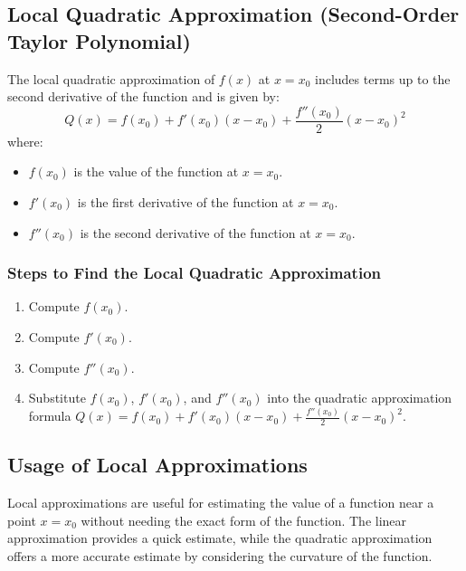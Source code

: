 \documentclass{article}
\begin{document}
\subsection*{Local Quadratic Approximation (Second-Order Taylor Polynomial)}
The local quadratic approximation of \( f(x) \) at \( x = x_0 \) includes terms up to the second derivative of the function and is given by:
\[ Q(x) = f(x_0) + f'(x_0)(x - x_0) + \frac{f''(x_0)}{2}(x - x_0)^2 \]
where:
\begin{itemize}
\item \( f(x_0) \) is the value of the function at \( x = x_0 \).
\item \( f'(x_0) \) is the first derivative of the function at \( x = x_0 \).
\item \( f''(x_0) \) is the second derivative of the function at \( x = x_0 \).
\end{itemize}

\begin{center}
\end{center}

\subsubsection*{Steps to Find the Local Quadratic Approximation}
\begin{enumerate}
\item Compute \( f(x_0) \).
\item Compute \( f'(x_0) \).
\item Compute \( f''(x_0) \).
\item Substitute \( f(x_0) \), \( f'(x_0) \), and \( f''(x_0) \) into the quadratic approximation formula \( Q(x) = f(x_0) + f'(x_0)(x - x_0) + \frac{f''(x_0)}{2}(x - x_0)^2 \).
\end{enumerate}

\subsection*{Usage of Local Approximations}
Local approximations are useful for estimating the value of a function near a point \( x = x_0 \) without needing the exact form of the function. The linear approximation provides a quick estimate, while the quadratic approximation offers a more accurate estimate by considering the curvature of the function.
\end{document}
